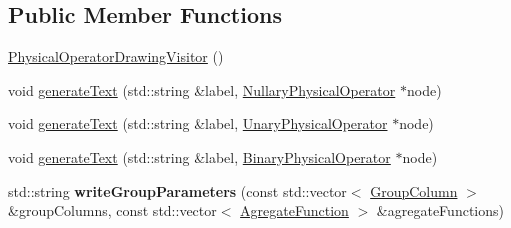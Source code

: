 \subsection*{Public Member Functions}
\begin{DoxyCompactItemize}
\item 
\hyperlink{class_physical_operator_drawing_visitor_a2168858696bd1ce675cef6b895fe995b}{Physical\+Operator\+Drawing\+Visitor} ()
\item 
void \hyperlink{class_physical_operator_drawing_visitor_a50acb8aae6d2b5fffff964f7d84b079f}{generate\+Text} (std\+::string \&label, \hyperlink{class_nullary_physical_operator}{Nullary\+Physical\+Operator} $\ast$node)
\item 
void \hyperlink{class_physical_operator_drawing_visitor_ab2637eab548a1c1d832a877363ede4a9}{generate\+Text} (std\+::string \&label, \hyperlink{class_unary_physical_operator}{Unary\+Physical\+Operator} $\ast$node)
\item 
void \hyperlink{class_physical_operator_drawing_visitor_a3abc3dcacc46a1004f7a9fb26f56154b}{generate\+Text} (std\+::string \&label, \hyperlink{class_binary_physical_operator}{Binary\+Physical\+Operator} $\ast$node)
\item 
\hypertarget{class_physical_operator_drawing_visitor_a4729d5a2f38e5318f44149942fb8e3c3}{std\+::string {\bfseries write\+Group\+Parameters} (const std\+::vector$<$ \hyperlink{class_group_column}{Group\+Column} $>$ \&group\+Columns, const std\+::vector$<$ \hyperlink{class_agregate_function}{Agregate\+Function} $>$ \&agregate\+Functions)}\label{class_physical_operator_drawing_visitor_a4729d5a2f38e5318f44149942fb8e3c3}


\end{DoxyCompactItemize}
